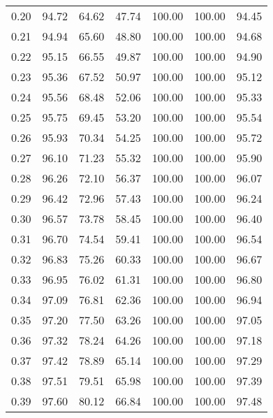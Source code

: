 \begin{tabular}{|c|c|c|c|c|c|c|}
      0.20 &     94.72 &     64.62 &      47.74 &  100.00 &     100.00 &         94.45 \\
      0.21 &     94.94 &     65.60 &      48.80 &  100.00 &     100.00 &         94.68 \\
      0.22 &     95.15 &     66.55 &      49.87 &  100.00 &     100.00 &         94.90 \\
      0.23 &     95.36 &     67.52 &      50.97 &  100.00 &     100.00 &         95.12 \\
      0.24 &     95.56 &     68.48 &      52.06 &  100.00 &     100.00 &         95.33 \\
      0.25 &     95.75 &     69.45 &      53.20 &  100.00 &     100.00 &         95.54 \\
      0.26 &     95.93 &     70.34 &      54.25 &  100.00 &     100.00 &         95.72 \\
      0.27 &     96.10 &     71.23 &      55.32 &  100.00 &     100.00 &         95.90 \\
      0.28 &     96.26 &     72.10 &      56.37 &  100.00 &     100.00 &         96.07 \\
      0.29 &     96.42 &     72.96 &      57.43 &  100.00 &     100.00 &         96.24 \\
      0.30 &     96.57 &     73.78 &      58.45 &  100.00 &     100.00 &         96.40 \\
      0.31 &     96.70 &     74.54 &      59.41 &  100.00 &     100.00 &         96.54 \\
      0.32 &     96.83 &     75.26 &      60.33 &  100.00 &     100.00 &         96.67 \\
      0.33 &     96.95 &     76.02 &      61.31 &  100.00 &     100.00 &         96.80 \\
      0.34 &     97.09 &     76.81 &      62.36 &  100.00 &     100.00 &         96.94 \\
      0.35 &     97.20 &     77.50 &      63.26 &  100.00 &     100.00 &         97.05 \\
      0.36 &     97.32 &     78.24 &      64.26 &  100.00 &     100.00 &         97.18 \\
      0.37 &     97.42 &     78.89 &      65.14 &  100.00 &     100.00 &         97.29 \\
      0.38 &     97.51 &     79.51 &      65.98 &  100.00 &     100.00 &         97.39 \\
      0.39 &     97.60 &     80.12 &      66.84 &  100.00 &     100.00 &         97.48 \\

\end{tabular}
